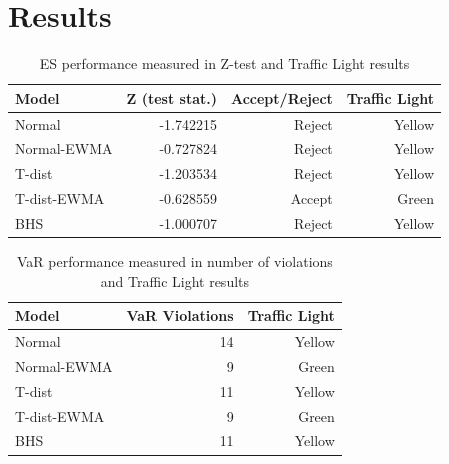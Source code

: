 \documentclass[a4paper]{article}
\begin{document}
\section{Results}
\begin{table}[H]
    \centering
    \caption{ES performance measured in Z-test and Traffic Light results}
    \vspace{0.2cm}
    \begin{tabular}{lrrr}
        \toprule
                Model &  Z (test stat.) & Accept/Reject & Traffic Light \\
        \midrule
                Normal &       -1.742215 &        Reject &                         Yellow \\
            Normal-EWMA &       -0.727824 &        Reject &                         Yellow \\
                T-dist &       -1.203534 &        Reject &                         Yellow \\
            T-dist-EWMA &       -0.628559 &        Accept &                          Green \\
            BHS &       -1.000707 &        Reject &                         Yellow \\
        \bottomrule
    \end{tabular} 
\end{table}



\begin{table}[H]
    \centering
    \caption{VaR performance measured in number of violations and Traffic Light results}
    \vspace{0.2cm}
    \begin{tabular}{lrr}
        \toprule
              Model &  VaR Violations & Traffic Light \\
        \midrule
              Normal &               14 &                           Yellow \\
         Normal-EWMA &                9 &                            Green \\
              T-dist &               11 &                           Yellow \\
         T-dist-EWMA &                9 &                            Green \\
            BHS &               11 &                           Yellow \\
        \bottomrule
    \end{tabular}    
\end{table}
 
\end{document}
